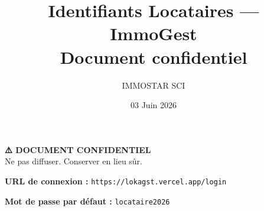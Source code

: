 \documentclass[a4paper,11pt]{article}
\title{\textbf{Identifiants Locataires — ImmoGest} \\ \large Document confidentiel}
\author{IMMOSTAR SCI}
\date{03 Juin 2026}
\begin{document}
\maketitle

\begin{center}
\colorbox{red!10}{\parbox{0.8\textwidth}{\centering\textbf{⚠️ DOCUMENT CONFIDENTIEL} \\ Ne pas diffuser. Conserver en lieu sûr.}}
\end{center}

\vspace{0.5cm}

\textbf{URL de connexion :} \texttt{https://lokagst.vercel.app/login}

\textbf{Mot de passe par défaut :} \texttt{locataire2026}

\vspace{0.5cm}
\end{document}
